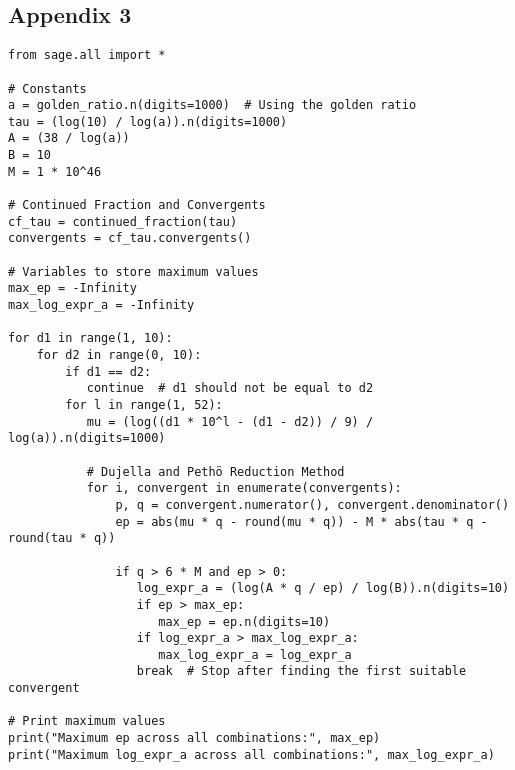 \subsection*{Appendix 3}\label{app3}
\begin{verbatim}
from sage.all import *

# Constants
a = golden_ratio.n(digits=1000)  # Using the golden ratio
tau = (log(10) / log(a)).n(digits=1000)
A = (38 / log(a))
B = 10
M = 1 * 10^46

# Continued Fraction and Convergents
cf_tau = continued_fraction(tau)
convergents = cf_tau.convergents()

# Variables to store maximum values
max_ep = -Infinity
max_log_expr_a = -Infinity

for d1 in range(1, 10):
    for d2 in range(0, 10):
        if d1 == d2:
           continue  # d1 should not be equal to d2
        for l in range(1, 52):
           mu = (log((d1 * 10^l - (d1 - d2)) / 9) / log(a)).n(digits=1000)

           # Dujella and Pethö Reduction Method
           for i, convergent in enumerate(convergents):
               p, q = convergent.numerator(), convergent.denominator()
               ep = abs(mu * q - round(mu * q)) - M * abs(tau * q - round(tau * q))

               if q > 6 * M and ep > 0:
                  log_expr_a = (log(A * q / ep) / log(B)).n(digits=10)
                  if ep > max_ep:
                     max_ep = ep.n(digits=10)
                  if log_expr_a > max_log_expr_a:
                     max_log_expr_a = log_expr_a
                  break  # Stop after finding the first suitable convergent

# Print maximum values
print("Maximum ep across all combinations:", max_ep)
print("Maximum log_expr_a across all combinations:", max_log_expr_a)
\end{verbatim}

